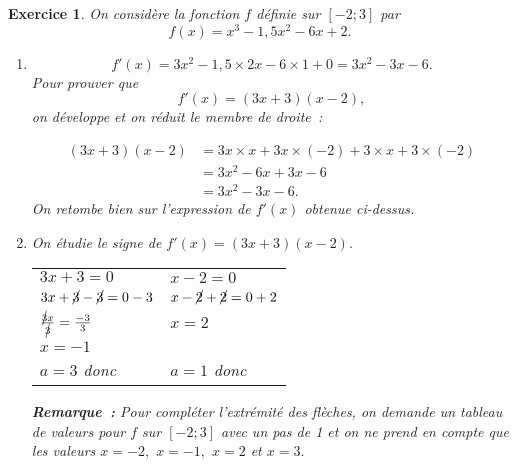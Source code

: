 \documentclass[10pt]{article}
\newtheorem{exo}{Exercice}
\begin{document}
\begin{exo}

On considère la fonction $f$ définie sur $\left[-2;3\right]$ par \[f(x)=x^3-1,5x^2-6x+2.\]
 
\begin{enumerate}
\item \[f'(x)=3x^2-1,5\times 2x-6\times 1+0=3x^2-3x-6.\] Pour prouver que
\[f'(x)=(3x+3)(x-2),\] on développe et on réduit le membre de droite~:

\begin{align*}
(3x+3)(x-2)&=3x\times x+3x\times (-2)+3\times x+3\times (-2)\\
&=3x^2-6x+3x-6\\
&=3x^2-3x-6.\end{align*} On retombe bien sur l'expression de $f'(x)$ obtenue ci-dessus.
\item On étudie le signe de $f'(x)=(3x+3)(x-2).$

\medskip

{\setlength{\arrayrulewidth}{2pt}
\begin{center}
\begin{tabular}{l|l}
$3x+3=0$&$x-2=0$\\
$3x+\cancel{3}-\cancel{3}=0-3$&$x-\cancel{2}+\cancel{2}=0+2$\\
$\frac{\cancel{3}x}{\cancel{3}}=\frac{-3}{3}$&$x=2$\\
$x=-1$& \\
$a=3$ donc \fbox{$-~\upphi~+$}&$a=1$ donc \fbox{$-~\upphi~+$}
\end{tabular}
\end{center}}

\medskip


\begin{center}
\end{center}

\medskip

\textbf{Remarque~:} Pour compléter l'extrémité des flèches, on demande un tableau de valeurs pour $f$ sur $\left[-2;3\right]$ avec un pas de 1 et on ne prend en compte que les valeurs $x=-2,$ $x=-1,$ $x=2$ et $x=3.$

\end{enumerate}

\end{exo}
\end{document}
